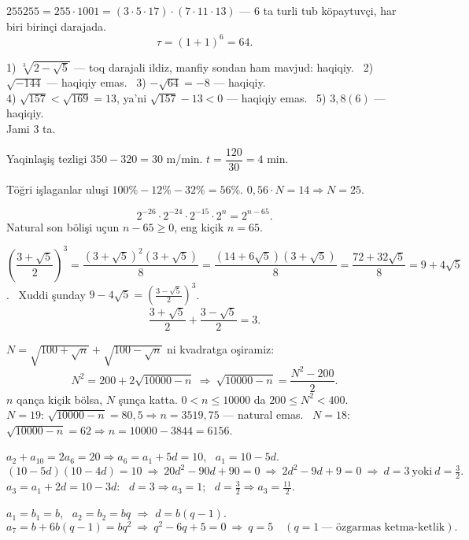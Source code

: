 




$255255=255\cdot1001=(3\cdot5\cdot17)\cdot(7\cdot11\cdot13)$ — 6 ta turli tub köpaytuvçi, har biri birinçi darajada.
\[\tau=(1+1)^6=64.\]

1) $\sqrt[3]{2-\sqrt5}$ — toq darajali ildiz, manfiy sondan ham mavjud: haqiqiy. \ 2) $\sqrt{-144}$ — haqiqiy emas. \ 3) $-\sqrt{64}=-8$ — haqiqiy.\\
4) $\sqrt{157}<\sqrt{169}=13$, ya'ni $\sqrt{157}-13<0$ — haqiqiy emas. \ 5) $3{,}8(6)$ — haqiqiy.\\
Jami 3 ta.

Yaqinlaşiş tezligi $350-320=30$ m/min. \quad $t=\dfrac{120}{30}=4$ min.

Töğri işlaganlar uluşi $100\%-12\%-32\%=56\%$. \quad $0{,}56\cdot N=14\Rightarrow N=25$.

\[2^{-26}\cdot2^{-24}\cdot2^{-15}\cdot2^n=2^{n-65}.\]
Natural son bölişi uçun $n-65\ge0$, eng kiçik $n=65$.

$\left(\dfrac{3+\sqrt5}2\right)^3=\dfrac{(3+\sqrt5)^2(3+\sqrt5)}8=\dfrac{(14+6\sqrt5)(3+\sqrt5)}8=\dfrac{72+32\sqrt5}8=9+4\sqrt5$. \ Xuddi şunday $9-4\sqrt5=\left(\frac{3-\sqrt5}2\right)^3$.
\[\frac{3+\sqrt5}2+\frac{3-\sqrt5}2=3.\]

$N=\sqrt{100+\sqrt n}+\sqrt{100-\sqrt n}$ ni kvadratga oşiramiz:
\[N^2=200+2\sqrt{10000-n}\ \Rightarrow\ \sqrt{10000-n}=\frac{N^2-200}2.\]
$n$ qança kiçik bölsa, $N$ şunça katta. $0<n\le10000$ da $200\le N^2<400$.\\
$N=19$: $\sqrt{10000-n}=80{,}5\Rightarrow n=3519{,}75$ — natural emas. \ $N=18$: $\sqrt{10000-n}=62\Rightarrow n=10000-3844=6156$.

$a_2+a_{10}=2a_6=20\Rightarrow a_6=a_1+5d=10$, \ $a_1=10-5d$.
\[(10-5d)(10-4d)=10\ \Rightarrow\ 20d^2-90d+90=0\ \Rightarrow\ 2d^2-9d+9=0\ \Rightarrow\ d=3\ \text{yoki}\ d=\tfrac32.\]
$a_3=a_1+2d=10-3d$: \ $d=3\Rightarrow a_3=1$; \ $d=\frac32\Rightarrow a_3=\frac{11}2$.

$a_1=b_1=b$, \ $a_2=b_2=bq$ $\Rightarrow$ $d=b(q-1)$.
\[a_7=b+6b(q-1)=bq^2\ \Rightarrow\ q^2-6q+5=0\ \Rightarrow\ q=5\quad(q=1\ \text{— özgarmas ketma-ketlik}).\]

